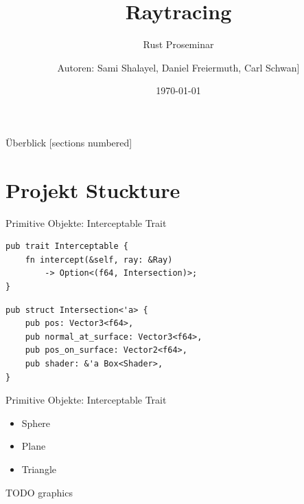 \documentclass{beamer}
\title{Raytracing}
\subtitle{Rust Proseminar}
\author[Sami Shalayel, Daniel Freiermuth, Carl Schwan]{%
    Autoren: Sami Shalayel, Daniel Freiermuth, Carl Schwan]}
\institute{Universität des Saarlandes}
\date{\today}
\begin{document}
\maketitle

\begin{frame}{Überblick}
    [sections numbered]
    \tableofcontents[hideallsubsections]
\end{frame}

\section{Projekt Stuckture}
\begin{frame}[fragile]{Primitive Objekte: Interceptable Trait}
    \begin{lstlisting}
pub trait Interceptable {
    fn intercept(&self, ray: &Ray)
        -> Option<(f64, Intersection)>;
}
    \end{lstlisting}
    \begin{lstlisting}
pub struct Intersection<'a> {
    pub pos: Vector3<f64>,
    pub normal_at_surface: Vector3<f64>,
    pub pos_on_surface: Vector2<f64>,
    pub shader: &'a Box<Shader>,
}
    \end{lstlisting}
\end{frame}

\begin{frame}{Primitive Objekte: Interceptable Trait}
    \begin{itemize}
        \item Sphere
        \item Plane
        \item Triangle
    \end{itemize}
    TODO graphics
\end{frame}
\end{document}
